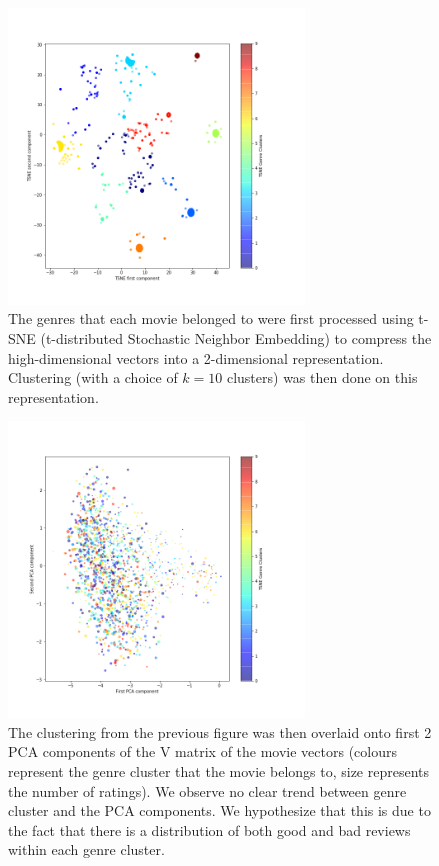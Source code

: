 \documentclass{article}
\begin{document}
\begin{figure}[H]
	\centering
	\includegraphics[width=0.7\textwidth]{TSNEcluster.png}
	\caption{The genres that each movie belonged to were first processed using t-SNE (t-distributed Stochastic Neighbor Embedding) to compress the high-dimensional vectors into a 2-dimensional representation. Clustering (with a choice of $k=10$ clusters) was then done on this representation.
	}
\end{figure}

\begin{figure}[H]
	\centering
	\includegraphics[width=0.7\textwidth]{TSNE_PCA_cluster.png}
	\caption{The clustering from the previous figure was then overlaid onto first 2 PCA components of the V matrix of the movie vectors (colours represent the genre cluster that the movie belongs to, size represents the number of ratings). We observe no clear trend between genre cluster and the PCA components. We hypothesize that this is due to the fact that there is a distribution of both good and bad reviews within each genre cluster. 
	}
\end{figure}
\end{document}
